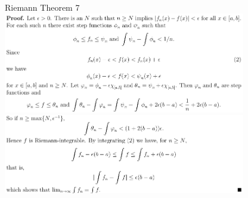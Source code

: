 \documentclass[8pt,landscape]{article}
\begin{document}
\begin{multicols}{2}
    Riemann Theorem 7
    \includegraphics[width=400]{R_t7a.png} \\
    \includegraphics[width=400]{R_t7b.png} \\


\end{multicols}
\end{document}
